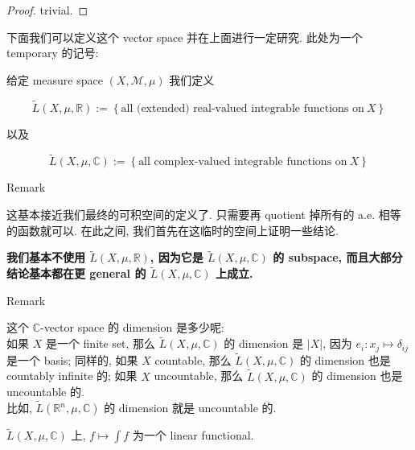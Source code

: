 \begin{proof}

trivial.

\end{proof}

下面我们可以定义这个 vector space 并在上面进行一定研究. 此处为一个 temporary 的记号:

\begin{definition}{}

给定 measure space \((X,\mathcal{M},\mu)\) 我们定义

\[\widetilde{L}(X,\mu,\mathbb{R}) := \left\{ {\text{all (extended) real-valued integrable functions on}\ X} \right\}\]

以及

\[\widetilde{L}(X,\mu,\mathbb{C}) := \left\{ {\text{all complex-valued integrable functions on}\ X} \right\}\]

\end{definition}

\begin{qlremark}{Remark}

这基本接近我们最终的可积空间的定义了. 只需要再 quotient 掉所有的 a.e. 相等的函数就可以. 在此之间, 我们首先在这临时的空间上证明一些结论.

\textbf{我们基本不使用 \(\widetilde{L}(X,\mu,\mathbb{R})\), 因为它是 \(\widetilde{L}(X,\mu,\mathbb{C})\) 的 subspace, 而且大部分结论基本都在更 general 的 \(\widetilde{L}(X,\mu,\mathbb{C})\) 上成立.}

\end{qlremark}

\begin{qlremark}{Remark}

这个 \(\mathbb{C}\)-vector space 的 dimension 是多少呢:\\
如果 \(X\) 是一个 finite set, 那么 \(\widetilde{L}(X,\mu,\mathbb{C})\) 的 dimension 是 \(|X|\), 因为 \(e_{i}:x_{j}\mapsto\delta_{ij}\) 是一个 basis; 同样的, 如果 \(X\) countable, 那么 \(\widetilde{L}(X,\mu,\mathbb{C})\) 的 dimension 也是 countably infinite 的; 如果 \(X\) uncountable, 那么 \(\widetilde{L}(X,\mu,\mathbb{C})\) 的 dimension 也是 uncountable 的.\\
比如, \(\widetilde{L}(\mathbb{R}^{n},\mu,\mathbb{C})\) 的 dimension 就是 uncountable 的.

\end{qlremark}

\begin{proposition}

\(\widetilde{L}(X,\mu,\mathbb{C})\) 上, \(f\mapsto\int f\) 为一个 linear functional.

\end{proposition}

